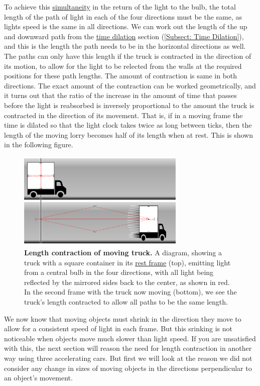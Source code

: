 To achieve this \hyperlink{def-simultaneity}{simultaneity} in the return of the light to the bulb, the total length of the path of light in each of the four directions must be the same, as lights speed is the same in all directions.
We can work out the length of the up and downward path from the \hyperlink{def-time-dilation}{time dilation} section (\ref{Subsect: Time Dilation}), and this is the length the path needs to be in the horizontal directions as well.
The paths can only have this length if the truck is contracted in the direction of its motion, to allow for the light to be relected from the walls at the required positions for these path lengths.
The amount of contraction is same in both directions.
The exact amount of the contraction can be worked geometrically, and it turns out that the ratio of the increase in the amount of time that passes before the light is reabsorbed is inversely proportional to the amount the truck is contracted in the direction of its movement.
That is, if in a moving frame the time is dilated so that the light clock takes twice as long between ticks, then the length of the moving lorry becomes half of its length when at rest.
This is shown in the following figure.

\begin{figure}[H]
	\centering
	\includegraphics[width = 8cm]{images/pdf/Full_Lorry_Transform.pdf}
	\caption{\textbf{Length contraction of moving truck.} A diagram, showing a truck with a square container in its \protect\hyperlink{def-proper-frame}{rest frame} (top), emitting light from a central bulb in the four directions, with all light being reflected by the mirrored sides back to the center, as shown in red. In the second frame with the truck now moving (bottom), we see the truck's length contracted to allow all paths to be the same length.}
	\label{fig: full truck transform}
\end{figure}

We now know that moving objects must shrink in the direction they move to allow for a consistent speed of light in each frame.
But this srinking is not noticeable when objects move much slower than light speed.
If you are unsatisfied with this, the next section will reason the need for length contraction in another way using three accelerating cars.
But first we will look at the reason we did not consider any change in sizes of moving objects in the directions perpendicular to an object's movement.

